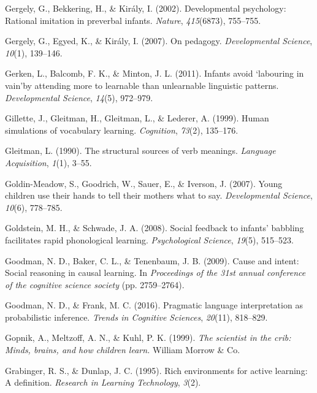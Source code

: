 \documentclass[oneside]{report}
\begin{document}
\leavevmode\hypertarget{ref-gergely2002developmental}{}%
Gergely, G., Bekkering, H., \& Király, I. (2002). Developmental
psychology: Rational imitation in preverbal infants. \emph{Nature},
\emph{415}(6873), 755--755.

\leavevmode\hypertarget{ref-gergely2007pedagogy}{}%
Gergely, G., Egyed, K., \& Király, I. (2007). On pedagogy.
\emph{Developmental Science}, \emph{10}(1), 139--146.

\leavevmode\hypertarget{ref-gerken2011infants}{}%
Gerken, L., Balcomb, F. K., \& Minton, J. L. (2011). Infants avoid
`labouring in vain'by attending more to learnable than unlearnable
linguistic patterns. \emph{Developmental Science}, \emph{14}(5),
972--979.

\leavevmode\hypertarget{ref-gillette1999human}{}%
Gillette, J., Gleitman, H., Gleitman, L., \& Lederer, A. (1999). Human
simulations of vocabulary learning. \emph{Cognition}, \emph{73}(2),
135--176.

\leavevmode\hypertarget{ref-gleitman1990structural}{}%
Gleitman, L. (1990). The structural sources of verb meanings.
\emph{Language Acquisition}, \emph{1}(1), 3--55.

\leavevmode\hypertarget{ref-goldin2007young}{}%
Goldin-Meadow, S., Goodrich, W., Sauer, E., \& Iverson, J. (2007). Young
children use their hands to tell their mothers what to say.
\emph{Developmental Science}, \emph{10}(6), 778--785.

\leavevmode\hypertarget{ref-goldstein2008social}{}%
Goldstein, M. H., \& Schwade, J. A. (2008). Social feedback to infants'
babbling facilitates rapid phonological learning. \emph{Psychological
Science}, \emph{19}(5), 515--523.

\leavevmode\hypertarget{ref-goodman2009cause}{}%
Goodman, N. D., Baker, C. L., \& Tenenbaum, J. B. (2009). Cause and
intent: Social reasoning in causal learning. In \emph{Proceedings of the
31st annual conference of the cognitive science society} (pp.
2759--2764).

\leavevmode\hypertarget{ref-goodman2016pragmatic}{}%
Goodman, N. D., \& Frank, M. C. (2016). Pragmatic language
interpretation as probabilistic inference. \emph{Trends in Cognitive
Sciences}, \emph{20}(11), 818--829.

\leavevmode\hypertarget{ref-gopnik1999scientist}{}%
Gopnik, A., Meltzoff, A. N., \& Kuhl, P. K. (1999). \emph{The scientist
in the crib: Minds, brains, and how children learn.} William Morrow \&
Co.

\leavevmode\hypertarget{ref-grabinger1995rich}{}%
Grabinger, R. S., \& Dunlap, J. C. (1995). Rich environments for active
learning: A definition. \emph{Research in Learning Technology},
\emph{3}(2).
\end{document}
